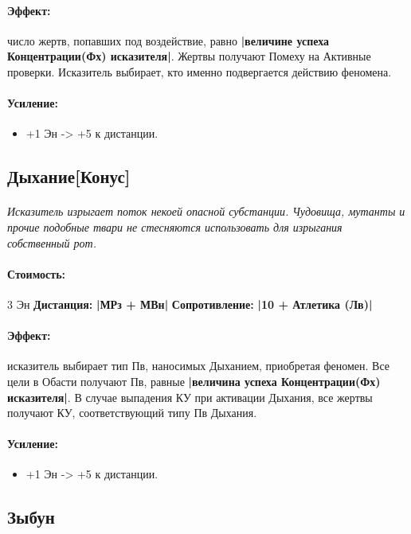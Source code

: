 \paragraph{Эффект: }число жертв, попавших под воздействие, равно 
\textbf{|величине успеха Концентрации(Фх) исказителя|}. Жертвы получают Помеху на Активные проверки. Исказитель выбирает, кто именно подвергается действию феномена.
\paragraph{Усиление:}
\begin{itemize}
\item+1 Эн -> +5 к дистанции.
\end{itemize}
\subsection{Дыхание[Конус]}
\paragraph{} 
\textit{Исказитель изрыгает поток некоей опасной субстанции. Чудовища, мутанты и прочие подобные твари не стесняются использовать для изрыгания собственный рот.}
\paragraph{Стоимость: }3 Эн
\newline
\textbf{Дистанция: }
\textbf{|МРз + МВн|}
\newline
\textbf{Сопротивление: }
\textbf{|10 + Атлетика (Лв)|}
\paragraph{Эффект: }исказитель выбирает тип Пв, наносимых Дыханием, приобретая феномен. Все цели в Обасти получают Пв, равные 
\textbf{|величина успеха Концентрации(Фх) исказителя|}. В случае выпадения КУ при активации Дыхания, все жертвы получают КУ, соответствующий типу Пв Дыхания.
\paragraph{Усиление:}
\begin{itemize}
\item+1 Эн -> +5 к дистанции.
\end{itemize}
\subsection{Зыбун}

